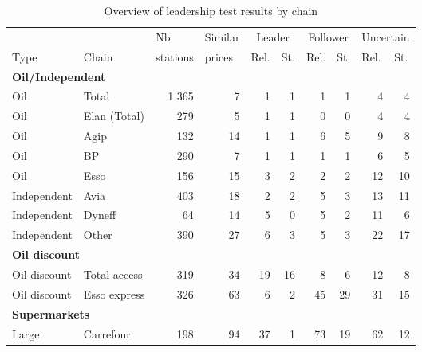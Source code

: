 \documentclass[english]{article}
\begin{document}
\begin{table}[hbtp]
\begin{threeparttable}
\renewcommand{\arraystretch}{0.8} %
\caption{Overview of leadership test results by chain}
\label{tab:stats_leadership}
    \begin{tabular}{llr|r|rr|rr|rr}
          &       & \multicolumn{1}{l|}{Nb} & \multicolumn{1}{l|}{Similar} & \multicolumn{2}{c|}{Leader} & \multicolumn{2}{c|}{Follower} & \multicolumn{2}{c}{Uncertain} \\
    Type  & Chain & \multicolumn{1}{l|}{stations} & \multicolumn{1}{l|}{prices} & \multicolumn{1}{l}{Rel.} & \multicolumn{1}{l|}{St.} & \multicolumn{1}{l}{Rel.} & \multicolumn{1}{l|}{St.} & \multicolumn{1}{l}{Rel.} & \multicolumn{1}{l}{St.} \\
    \midrule
    \multicolumn{2}{l}{\textbf{Oil/Independent}}  &       &       &       &       &       &       &       &  \\
    Oil   & Total & 1 365 & 7     & 1     & 1     & 1     & 1     & 4     & 4 \\
    Oil   & Elan (Total) & 279   & 5     & 1     & 1     & 0     & 0     & 4     & 4 \\
    Oil   & Agip  & 132   & 14    & 1     & 1     & 6     & 5     & 9     & 8 \\
    Oil  & BP    & 290   & 7     & 1     & 1     & 1     & 1     & 6     & 5 \\
    Oil  & Esso  & 156   & 15    & 3     & 2     & 2     & 2     & 12    & 10 \\
    Independent & Avia  & 403   & 18    & 2     & 2     & 5     & 3     & 13    & 11 \\
    Independent & Dyneff & 64    & 14    & 5     & 0     & 5     & 2     & 11    & 6 \\
    Independent & Other & 390   & 27    & 6     & 3     & 5     & 3     & 22    & 17 \\
    \midrule
    \multicolumn{2}{l}{\textbf{Oil discount}}       &       &       &       &       &       &       &       &  \\
    Oil discount & Total access & 319   & 34    & 19    & 16    & 8     & 6     & 12    & 8 \\
    Oil discount & Esso express & 326   & 63    & 6     & 2     & 45    & 29    & 31    & 15 \\
    \midrule
    \multicolumn{2}{l}{\textbf{Supermarkets}} &       &       &       &       &       &       &       &  \\
    Large & Carrefour & 198   & 94    & 37    & 1     & 73    & 19    & 62    & 12 \\

\end{tabular}
\end{threeparttable}
\end{table}
\end{document}
